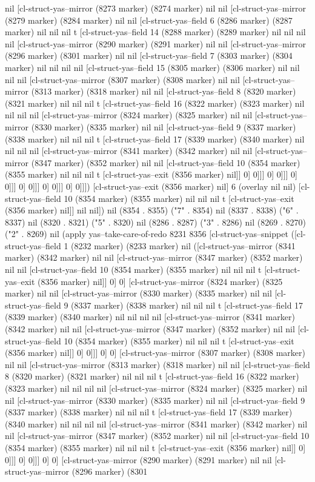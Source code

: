{{nil [cl-struct-yas--mirror (8273 marker) (8274 marker) nil nil [cl-struct-yas--mirror (8279 marker) (8284 marker) nil nil [cl-struct-yas--field 6 (8286 marker) (8287 marker) nil nil nil t [cl-struct-yas--field 14 (8288 marker) (8289 marker) nil nil nil nil [cl-struct-yas--mirror (8290 marker) (8291 marker) nil nil [cl-struct-yas--mirror (8296 marker) (8301 marker) nil nil [cl-struct-yas--field 7 (8303 marker) (8304 marker) nil nil nil nil [cl-struct-yas--field 15 (8305 marker) (8306 marker) nil nil nil nil [cl-struct-yas--mirror (8307 marker) (8308 marker) nil nil [cl-struct-yas--mirror (8313 marker) (8318 marker) nil nil [cl-struct-yas--field 8 (8320 marker) (8321 marker) nil nil nil t [cl-struct-yas--field 16 (8322 marker) (8323 marker) nil nil nil nil [cl-struct-yas--mirror (8324 marker) (8325 marker) nil nil [cl-struct-yas--mirror (8330 marker) (8335 marker) nil nil [cl-struct-yas--field 9 (8337 marker) (8338 marker) nil nil nil t [cl-struct-yas--field 17 (8339 marker) (8340 marker) nil nil nil nil [cl-struct-yas--mirror (8341 marker) (8342 marker) nil nil [cl-struct-yas--mirror (8347 marker) (8352 marker) nil nil [cl-struct-yas--field 10 (8354 marker) (8355 marker) nil nil nil t [cl-struct-yas--exit (8356 marker) nil]] 0] 0]]] 0] 0]]] 0] 0]]] 0] 0]]] 0] 0]]] 0] 0]]]) [cl-struct-yas--exit (8356 marker) nil] 6 (overlay nil nil) [cl-struct-yas--field 10 (8354 marker) (8355 marker) nil nil nil t [cl-struct-yas--exit (8356 marker) nil]] nil nil]) nil (8354 . 8355) ("7" . 8354) nil (8337 . 8338) ("6" . 8337) nil (8320 . 8321) ("5" . 8320) nil (8286 . 8287) ("3" . 8286) nil (8269 . 8270) ("2" . 8269) nil (apply yas--take-care-of-redo 8231 8356 [cl-struct-yas--snippet ([cl-struct-yas--field 1 (8232 marker) (8233 marker) nil ([cl-struct-yas--mirror (8341 marker) (8342 marker) nil nil [cl-struct-yas--mirror (8347 marker) (8352 marker) nil nil [cl-struct-yas--field 10 (8354 marker) (8355 marker) nil nil nil t [cl-struct-yas--exit (8356 marker) nil]] 0] 0] [cl-struct-yas--mirror (8324 marker) (8325 marker) nil nil [cl-struct-yas--mirror (8330 marker) (8335 marker) nil nil [cl-struct-yas--field 9 (8337 marker) (8338 marker) nil nil nil t [cl-struct-yas--field 17 (8339 marker) (8340 marker) nil nil nil nil [cl-struct-yas--mirror (8341 marker) (8342 marker) nil nil [cl-struct-yas--mirror (8347 marker) (8352 marker) nil nil [cl-struct-yas--field 10 (8354 marker) (8355 marker) nil nil nil t [cl-struct-yas--exit (8356 marker) nil]] 0] 0]]] 0] 0] [cl-struct-yas--mirror (8307 marker) (8308 marker) nil nil [cl-struct-yas--mirror (8313 marker) (8318 marker) nil nil [cl-struct-yas--field 8 (8320 marker) (8321 marker) nil nil nil t [cl-struct-yas--field 16 (8322 marker) (8323 marker) nil nil nil nil [cl-struct-yas--mirror (8324 marker) (8325 marker) nil nil [cl-struct-yas--mirror (8330 marker) (8335 marker) nil nil [cl-struct-yas--field 9 (8337 marker) (8338 marker) nil nil nil t [cl-struct-yas--field 17 (8339 marker) (8340 marker) nil nil nil nil [cl-struct-yas--mirror (8341 marker) (8342 marker) nil nil [cl-struct-yas--mirror (8347 marker) (8352 marker) nil nil [cl-struct-yas--field 10 (8354 marker) (8355 marker) nil nil nil t [cl-struct-yas--exit (8356 marker) nil]] 0] 0]]] 0] 0]]] 0] 0] [cl-struct-yas--mirror (8290 marker) (8291 marker) nil nil [cl-struct-yas--mirror (8296 marker) (8301 }}
